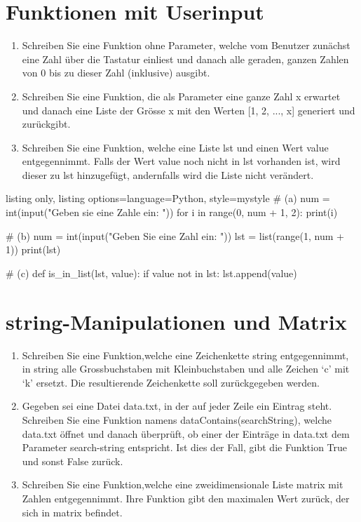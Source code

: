 \documentclass[11pt, oneside]{book}
\begin{document}
\section{Funktionen mit Userinput}
\begin{enumerate}[label=(\alph*)]
    \item Schreiben Sie eine Funktion ohne Parameter, welche vom Benutzer zunächst eine Zahl \"uber die Tastatur einliest und danach alle geraden, ganzen Zahlen von 0 bis zu dieser Zahl (inklusive) ausgibt.
    \item Schreiben Sie eine Funktion, die als Parameter eine ganze Zahl x erwartet und danach eine Liste der Grösse x mit den Werten [1, 2, ..., x] generiert und zur\"uckgibt.
    \item Schreiben Sie eine Funktion, welche eine Liste lst und einen Wert value entgegennimmt. Falls der Wert value noch nicht in lst vorhanden ist, wird dieser zu lst hinzugef\"ugt, andernfalls wird die Liste nicht verändert.
\end{enumerate}

\begin{tcblisting}{listing only, listing options={language=Python, style=mystyle}}
# (a)
num = int(input("Geben sie eine Zahle ein: "))
for i in range(0, num + 1, 2):
    print(i)

# (b)
num = int(input("Geben Sie eine Zahl ein: "))
lst = list(range(1, num + 1))
print(lst)

# (c)
def is_in_list(lst, value):
    if value not in lst:
        lst.append(value)
\end{tcblisting}

\newpage
\section{string-Manipulationen und Matrix}
\begin{enumerate}[label=(\alph*)]
    \item Schreiben Sie eine Funktion,welche eine Zeichenkette string entgegennimmt, in string alle Grossbuchstaben mit Kleinbuchstaben und alle Zeichen ‘c’ mit ‘k’ ersetzt. Die resultierende Zeichenkette soll zur\"uckgegeben werden.
    \item Gegeben sei eine Datei data.txt, in der auf jeder Zeile ein Eintrag steht. Schreiben Sie eine Funktion namens dataContains(searchString), welche data.txt öffnet und danach \"uberpr\"uft, ob einer der Einträge in data.txt dem Parameter search-string entspricht. Ist dies der Fall, gibt die Funktion True und sonst False zur\"uck.
    \item Schreiben Sie eine Funktion,welche eine zweidimensionale Liste matrix mit Zahlen entgegennimmt. Ihre Funktion gibt den maximalen Wert zur\"uck, der sich in matrix befindet.
\end{enumerate}
\end{document}

